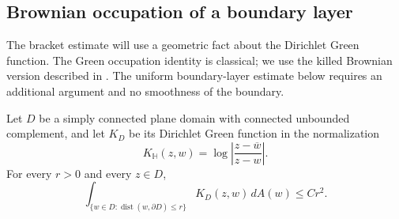 \subsection{Brownian occupation of a boundary layer}

The bracket estimate will use a geometric fact about the Dirichlet
Green function.  The Green occupation identity is classical; we use
the killed Brownian version described in
\cite[\S3.3, Definitions~3.28 and~3.31 and Theorem~3.32, pp.~78--80]{mortersperes2010}.  The uniform boundary-layer
estimate below requires an additional argument and no smoothness of
the boundary.

\begin{lemma}\label{mesh:layer}
Let $D$ be a simply connected plane domain with connected unbounded
complement, and let $K_D$ be its Dirichlet Green function in the
normalization
\[
 K_{\mathbb H}(z,w)=\log\left|\frac{z-\overline w}{z-w}\right|.
\]
For every $r>0$ and every $z\in D$,
\begin{equation}
 \int_{\{w\in D:\operatorname{dist}(w,\partial D)\le r\}}
 K_D(z,w)\,dA(w)\le Cr^2.
 \label{mesh:layer-bound}
\end{equation}
\end{lemma}

